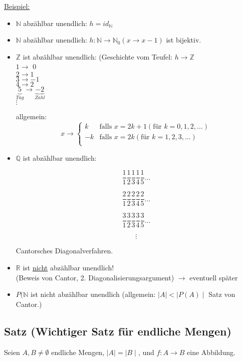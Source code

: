 \documentclass[a4paper, 12pt, twoside] {article}
\begin{document}
\underline{Beispiel:}
\begin{itemize}
\item $\mathbb{N}$  abzählbar unendlich: $h = id_{\mathbb{N}}$
\item $\mathbb{N}$ abzählbar unendlich: $h \colon \mathbb{N} \rightarrow \mathbb{N}_{0} (x \rightarrow x-1)$ ist bijektiv.
\item $\mathbb{Z}$ ist abzählbar unendlich: (Geschichte vom Teufel:  $h \rightarrow \mathbb{Z}$ \\
$1 \rightarrow$ 0 \\
$2 \rightarrow 1$ \\
$3 \rightarrow -1$ \\
$4 \rightarrow 2$ \\
$\underbrace{5}_{Tag} \rightarrow \underbrace{-2}_{Zahl}$ \\
$\vdots$

allgemein: \\
\[ x \rightarrow
  \begin{cases}
    k & \text{falls } x = 2k+1 (\text{für } k = 0, 1, 2, ...)\\
    -k  & \text{falls } x = 2k (\text{für } k = 1, 2, 3, ...)\\
  \end{cases}
\]

\item $\mathbb{Q}$ ist abzählbar unendlich:

$$\frac{1}{1} \frac{1}{2} \frac{1}{3} \frac{1}{4} \frac{1}{5} ...$$

$$\frac{2}{1} \frac{2}{2} \frac{2}{3} \frac{2}{4} \frac{2}{5} ...$$

$$\frac{3}{1} \frac{3}{2} \frac{3}{3} \frac{3}{4} \frac{3}{5} ...$$

$$\vdots$$

Cantorsches Diagonalverfahren.

\item $\mathbb{R}$ ist \underline{nicht} abzählbar unendlich! \\
(Beweis von Cantor, 2. Diagonalisierungsargument)
$\rightarrow$ eventuell später

\item $P(\mathbb{N}$ ist nicht abzählbar unendlich (allgemein: $\mid A \mid < \mid P(A) \mid$ Satz von Cantor.)

\end{itemize}

\subsection{Satz (Wichtiger Satz für endliche Mengen)} %
Seien $A, B \neq \emptyset$ endliche Mengen, $\mid A \mid = \mid B \mid$, und $f \colon A \rightarrow B$ eine Abbildung.
\end{document}
